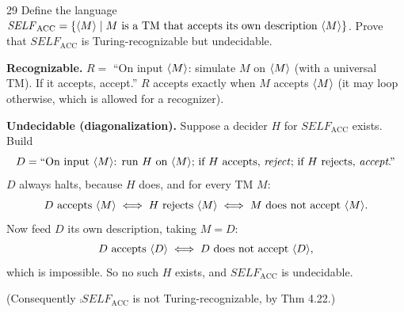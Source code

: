 \begin{question}{29}
Define the language $\mathit{SELF}_{\mathrm{ACC}}=\{\langle M\rangle\mid M \text{ is a TM that accepts its own description } \langle M\rangle\}$. Prove that $\mathit{SELF}_{\mathrm{ACC}}$ is Turing-recognizable but undecidable.
\end{question}
\begin{soln}
\textbf{Recognizable.} $R=$ ``On input $\langle M\rangle$: simulate $M$ on $\langle M\rangle$ (with a universal TM). If it accepts, accept.''
$R$ accepts exactly when $M$ accepts $\langle M\rangle$ (it may loop otherwise, which is allowed for a recognizer).

\textbf{Undecidable (diagonalization).} Suppose a decider $H$ for $\mathit{SELF}_{\mathrm{ACC}}$ exists. Build
\[
D=\text{``On input } \langle M\rangle\text{: run } H \text{ on } \langle M\rangle \text{; if } H \text{ accepts, \emph{reject}; if } H \text{ rejects, \emph{accept}.''}
\]
$D$ always halts, because $H$ does, and for every TM $M$:
\[
D \text{ accepts } \langle M\rangle \iff H \text{ rejects } \langle M\rangle \iff M \text{ does not accept } \langle M\rangle .
\]
Now feed $D$ its own description, taking $M=D$:
\[
D \text{ accepts } \langle D\rangle \iff D \text{ does not accept } \langle D\rangle ,
\]
which is impossible. So no such $H$ exists, and $\mathit{SELF}_{\mathrm{ACC}}$ is undecidable.

(Consequently $\comp{\mathit{SELF}_{\mathrm{ACC}}}$ is not Turing-recognizable, by Thm 4.22.)
\end{soln}
